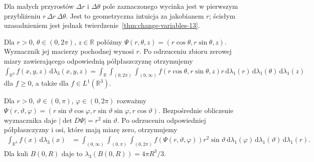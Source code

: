 \begin{center}
\end{center}
\noindent
Dla małych przyrostów $\Delta r$ i $\Delta\theta$ pole
zaznaczonego wycinka jest w pierwszym przybliżeniu
$r\,\Delta r\,\Delta\theta$. Jest to geometryczna intuicja
za jakobianem $r$; ścisłym uzasadnieniem jest jednak
twierdzenie~\ref{thm:change-variables-13}.

\begin{przyklad}
Dla $r>0$, $\theta\in(0,2\pi)$, $z\in\mathbb R$
połóżmy $\Psi(r,\theta,z)=(r\cos\theta,r\sin\theta,z)$.
Wyznacznik jej macierzy pochodnej wynosi $r$.
Po odrzuceniu zbioru zerowej miary zawierającego
odpowiednią półpłaszczyznę otrzymujemy
$\int_{\mathbb R^3}f(x,y,z)\,\mathrm d\lambda_3(x,y,z)
=\int_{\mathbb R}\int_{(0,2\pi)}\int_{(0,\infty)}
 f(r\cos\theta,r\sin\theta,z)r\,
\mathrm d\lambda_1(r)\,\mathrm d\lambda_1(\theta)
\,\mathrm d\lambda_1(z)$
dla $f\ge0$, a także dla $f\in L^1(\mathbb R^3)$.
\end{przyklad}

\begin{przyklad}
Dla $r>0$, $\vartheta\in(0,\pi)$, $\varphi\in(0,2\pi)$
rozważmy
$\Psi(r,\vartheta,\varphi)=
(r\sin\vartheta\cos\varphi,
 r\sin\vartheta\sin\varphi,r\cos\vartheta)$.
Bezpośrednie obliczenie wyznacznika daje
$|\det D\Psi|=r^2\sin\vartheta$.
Po odrzuceniu odpowiedniej półpłaszczyzny i osi,
które mają miarę zero, otrzymujemy
\begin{align*}
\int_{\mathbb R^3}f(x)\,\mathrm d\lambda_3(x)
&=\int_{(0,\infty)}\int_{(0,\pi)}\int_{(0,2\pi)}
 f(\Psi(r,\vartheta,\varphi))r^2\sin\vartheta\,
 \mathrm d\lambda_1(\varphi)\,\mathrm d\lambda_1(\vartheta)
 \,\mathrm d\lambda_1(r).
\end{align*}
Dla kuli $B(0,R)$ daje to $\lambda_3(B(0,R))=4\pi R^3/3$.
\end{przyklad}

